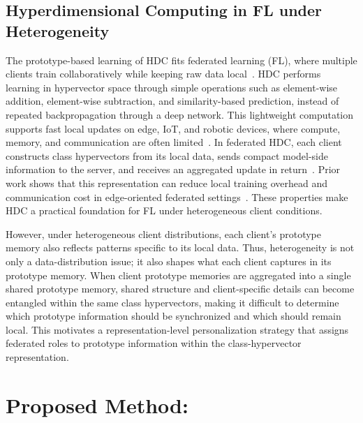 \documentclass[lettersize,journal]{IEEEtran}
\newcommand{\rev}[1]{#1}
\begin{document}
\subsection{Hyperdimensional Computing in FL under Heterogeneity}
The prototype-based learning of HDC fits federated learning (FL), where multiple clients train collaboratively while keeping raw data local~\cite{CHEN2025101568, 10546794, Tian2025Fed}.
HDC performs learning in hypervector space through simple operations such as element-wise addition, element-wise subtraction, and similarity-based prediction, instead of repeated backpropagation through a deep network.
This lightweight computation supports fast local updates on edge, IoT, and robotic devices, where compute, memory, and communication are often limited~\cite{hyunsei2025fed, 10610176}.
In federated HDC, each client constructs class hypervectors from its local data, sends compact model-side information to the server, and receives an aggregated update in return~\cite{flhdc2021hsieh,zhao2022fedhd}.
Prior work shows that this representation can reduce local training overhead and communication cost in edge-oriented federated settings~\cite{li2024hyperfeel,zeulin2023resourceefficientfederatedhyperdimensionalcomputing}.
These properties make HDC a practical foundation for FL under heterogeneous client conditions.

\rev{However, under heterogeneous client distributions, each client's prototype memory also reflects patterns specific to its local data.}
\rev{Thus, heterogeneity is not only a data-distribution issue; it also shapes what each client captures in its prototype memory.}
\rev{When client prototype memories are aggregated into a single shared prototype memory, shared structure and client-specific details can become entangled within the same class hypervectors, making it difficult to determine which prototype information should be synchronized and which should remain local.}
\rev{This motivates a representation-level personalization strategy that assigns federated roles to prototype information within the class-hypervector representation.}



\newcommand{\R}{\mathbb{R}}
\newcommand{\rownorm}{\operatorname{row\_normalize}}
\newcommand{\clip}{\operatorname{clip}}
\newcommand{\TopEig}{\operatorname{TopEig}}
\section{Proposed Method: \Design}
\label{sec:method}
\end{document}
